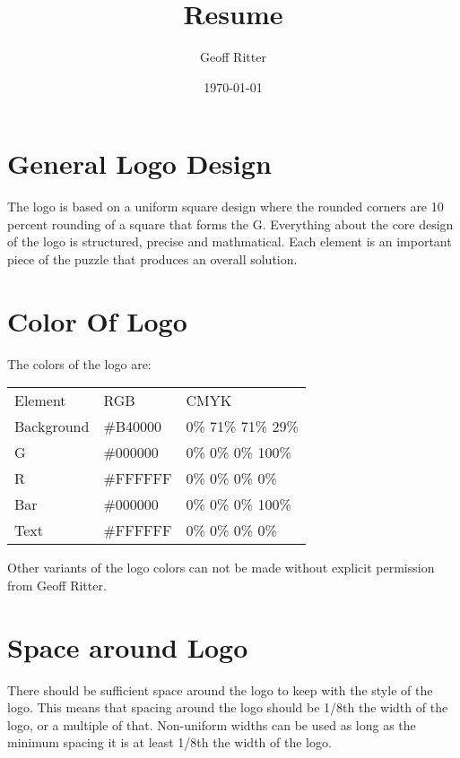 \documentclass{logo_styleguide}
\author{Geoff Ritter}
\title{Resume}
\date{\today}
\begin{document}
\header

\section{General Logo Design}
The logo is based on a uniform square design where the rounded corners are 10 percent rounding of a square that forms
the G. Everything about the core design of the logo is structured, precise and mathmatical. Each element is an important
piece of the puzzle that produces an overall solution.

\section{Color Of Logo}
The colors of the logo are:

\begin{tabular}{lll}
    Element & RGB & CMYK\\
    Background & \#B40000 & 0\% 71\% 71\% 29\%\\
    G & \#000000 & 0\% 0\% 0\% 100\%\\
    R & \#FFFFFF & 0\% 0\% 0\% 0\%\\
    Bar & \#000000 & 0\% 0\% 0\% 100\%\\
    Text & \#FFFFFF & 0\% 0\% 0\% 0\%\\
\end{tabular}

Other variants of the logo colors can not be made without explicit permission from Geoff Ritter.

\section{Space around Logo}
There should be sufficient space around the logo to keep with the style of the logo. This means that spacing around the
logo should be 1/8th the width of the logo, or a multiple of that. Non-uniform widths can be used as long as the minimum
spacing it is at least 1/8th the width of the logo.
\end{document}
